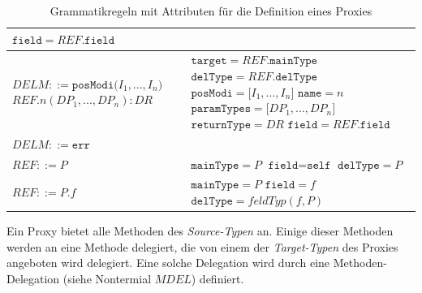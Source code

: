 \documentclass[a4paper,12pt]{article}
\begin{document}
\begin{table}[H]
\begin{tabular}{|p{6cm}|p{8cm}|}
$\texttt{field} = \mathit{REF}\texttt{.field}$
\\
\hline
$\mathit{DELM} ::=\texttt{posModi(} \mathit{I_1},...,\mathit{I_n} \texttt{)}$\newline
$\mathit{REF}\texttt{.}n(\mathit{DP_1},...,\mathit{DP_n}):DR $  
&
$\texttt{target} = \mathit{REF}.\texttt{mainType}$\newline
$\texttt{delType} = \mathit{REF}.\texttt{delType}$\newline
$\texttt{posModi} = \mathit{[I_1},...,\mathit{I_n]}$\newline
$\texttt{name} = \mathit{n}$\newline
$\texttt{paramTypes} = \mathit{[DP_1},...,\mathit{DP_n]}$\newline
$\texttt{returnType} = \mathit{DR}$\newline
$\texttt{field} = \mathit{REF}\texttt{.field}$
\\
\hline
$\mathit{DELM} ::= \texttt{err} $  
&
\\
\hline
$\mathit{REF} ::= \mathit{P}$
& 
$\texttt{mainType} = \mathit{P}$\newline
$\texttt{field} = \texttt{self}$\newline
$\texttt{delType} = \mathit{P}$
\\
\hline
$\mathit{REF} ::= \mathit{P}\texttt{.}\mathit{f}$
&
$\texttt{mainType} = \mathit{P}$\newline
$\texttt{field} = \mathit{f}$\newline
$\texttt{delType} = \mathit{feldTyp(f,P)}$
\\
\hline
\end{tabular}
\caption{Grammatikregeln mit Attributen für die Definition eines Proxies}
 \label{tab:attrGrProxies}
\end{table}
\noindent
Ein Proxy bietet alle Methoden des \emph{Source-Typen} an. Einige dieser Methoden werden an eine Methode delegiert, die von einem der \emph{Target-Typen} des Proxies angeboten wird delegiert. Eine solche Delegation wird durch eine Methoden-Delegation (siehe Nontermial $\mathit{MDEL}$) definiert.
\end{document}
